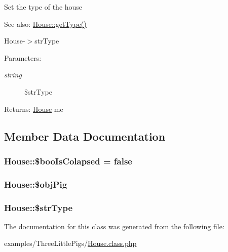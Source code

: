 Set the type of the house

\begin{Desc}
\item[See also:]\hyperlink{class_house_5da805a230c3e1d39f42d30c81a3f5b3}{House::getType()} 

House-$>$strType \end{Desc}
\begin{Desc}
\item[Parameters:]
\begin{description}
\item[{\em string}]\$strType \end{description}
\end{Desc}
\begin{Desc}
\item[Returns:]\hyperlink{class_house}{House} me \end{Desc}


\subsection{Member Data Documentation}
\hypertarget{class_house_34fc64c5c784bbcaf81168f9d5e051c3}{
\subsubsection[{\$booIsColapsed}]{\setlength{\rightskip}{0pt plus 5cm}House::\$booIsColapsed = false}}
\label{class_house_34fc64c5c784bbcaf81168f9d5e051c3}


\hypertarget{class_house_93c73a3dfd04bda657112823d0e7137e}{
\subsubsection[{\$objPig}]{\setlength{\rightskip}{0pt plus 5cm}House::\$objPig}}
\label{class_house_93c73a3dfd04bda657112823d0e7137e}


\hypertarget{class_house_81ebefceb0669e3fe446c4008c2a9a89}{
\subsubsection[{\$strType}]{\setlength{\rightskip}{0pt plus 5cm}House::\$strType}}
\label{class_house_81ebefceb0669e3fe446c4008c2a9a89}




The documentation for this class was generated from the following file:\begin{CompactItemize}
\item 
examples/ThreeLittlePigs/\hyperlink{_house_8class_8php}{House.class.php}\end{CompactItemize}
